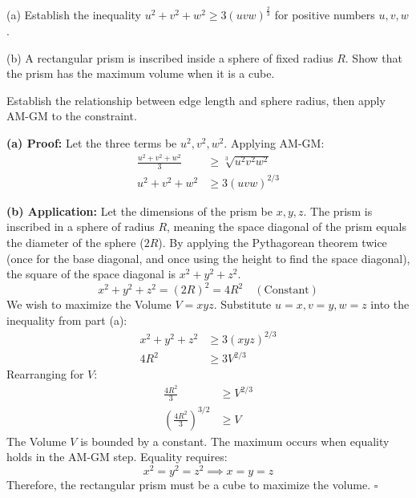 \begin{problem}
(a) Establish the inequality $u^2 + v^2 + w^2 \ge 3(uvw)^{\frac{2}{3}}$ for positive numbers $u, v, w$.

(b) A rectangular prism is inscribed inside a sphere of fixed radius $R$.
Show that the prism has the maximum volume when it is a cube.

\vspace{1cm}

\begin{center}
\end{center}
\end{problem}

\begin{hint}
Establish the relationship between edge length and sphere radius, then apply AM-GM to the constraint.
\end{hint}

\begin{solution}
\textbf{(a) Proof:}
Let the three terms be $u^2, v^2, w^2$. Applying AM-GM:
\begin{align*}
    \frac{u^2 + v^2 + w^2}{3} &\ge \sqrt[3]{u^2 v^2 w^2} \\
    u^2 + v^2 + w^2 &\ge 3 (uvw)^{2/3}
\end{align*}

\textbf{(b) Application:}
Let the dimensions of the prism be $x, y, z$.
The prism is inscribed in a sphere of radius $R$, meaning the space diagonal of the prism equals the diameter of the sphere ($2R$). By applying the Pythagorean theorem twice (once for the base diagonal, and once using the height to find the space diagonal), the square of the space diagonal is $x^2 + y^2 + z^2$.
\[ x^2 + y^2 + z^2 = (2R)^2 = 4R^2 \quad (\text{Constant}) \]
We wish to maximize the Volume $V = xyz$.
Substitute $u=x, v=y, w=z$ into the inequality from part (a):
\begin{align*}
    x^2 + y^2 + z^2 &\ge 3 (xyz)^{2/3} \\
    4R^2 &\ge 3 V^{2/3}
\end{align*}
Rearranging for $V$:
\begin{align*}
    \frac{4R^2}{3} &\ge V^{2/3} \\
    \left(\frac{4R^2}{3}\right)^{3/2} &\ge V
\end{align*}
The Volume $V$ is bounded by a constant. The maximum occurs when equality holds in the AM-GM step.
Equality requires:
\[ x^2 = y^2 = z^2 \implies x = y = z \]
Therefore, the rectangular prism must be a cube to maximize the volume. \hfill $\square$
\end{solution}

